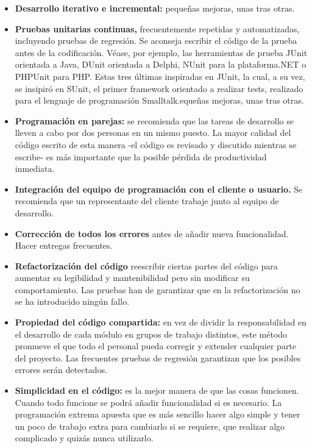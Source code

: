 \begin{itemize}
  \item \textbf{Desarrollo iterativo e incremental:} pequeñas mejoras, unas tras otras.
  \item \textbf{Pruebas unitarias continuas,} frecuentemente repetidas y automatizadas, incluyendo pruebas de regresión. Se aconseja escribir el código de la prueba antes de la codificación. Véase, por ejemplo, las herramientas de prueba JUnit orientada a Java, DUnit orientada a Delphi, NUnit para la plataforma.NET o PHPUnit para PHP. Estas tres últimas inspiradas en JUnit, la cual, a su vez, se insipiró en SUnit, el primer framework orientado a realizar tests, realizado para el lenguaje de programación Smalltalk.equeñas mejoras, unas tras otras.
  \item \textbf{Programación en parejas:} se recomienda que las tareas de desarrollo se lleven a cabo por dos personas en un mismo puesto. La mayor calidad del código escrito de esta manera -el código es revisado y discutido mientras se escribe- es más importante que la posible pérdida de productividad inmediata.
  \item \textbf{Integración del equipo de programación con el cliente o usuario.} Se recomienda que un representante del cliente trabaje junto al equipo de desarrollo.
  \item \textbf{Corrección de todos los errores} antes de añadir nueva funcionalidad. Hacer entregas frecuentes.
  \item \textbf{Refactorización del código} reescribir ciertas partes del código para aumentar su legibilidad y mantenibilidad pero sin modificar su comportamiento. Las pruebas han de garantizar que en la refactorización no se ha introducido ningún fallo.
  \item \textbf{Propiedad del código compartida:} en vez de dividir la responsabilidad en el desarrollo de cada módulo en grupos de trabajo distintos, este método promueve el que todo el personal pueda corregir y extender cualquier parte del proyecto. Las frecuentes pruebas de regresión garantizan que los posibles errores serán detectados.
  \item \textbf{Simplicidad en el código: } es la mejor manera de que las cosas funcionen. Cuando todo funcione se podrá añadir funcionalidad si es necesario. La programación extrema apuesta que es más sencillo hacer algo simple y tener un poco de trabajo extra para cambiarlo si se requiere, que realizar algo complicado y quizás nunca utilizarlo.
\end{itemize}

